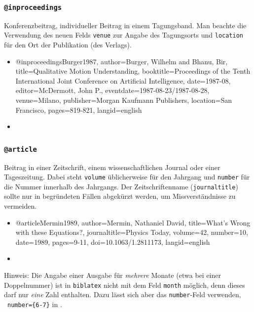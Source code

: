 
\subsubsection{\texttt{\bfseries @inproceedings}}
\label{sec:@inproceedings}

Konferenzbeitrag, individueller Beitrag in einem Tagungsband. Man beachte die
Verwendung des neuen Felds \texttt{venue} zur Angabe des Tagungsorts und
\texttt{location} für den Ort der Publikation (des Verlags).
%
\begin{itemize}
\item[]
\begin{GenericCode}[numbers=none]
@inproceedings{Burger1987,
  author={Burger, Wilhelm and Bhanu, Bir},
  title={Qualitative Motion Understanding},
  booktitle={Proceedings of the Tenth International Joint Conference on Artificial Intelligence},
  date={1987-08},
  editor={McDermott, John P.},
  eventdate={1987-08-23/1987-08-28},
  venue={Milano},
  publisher={Morgan Kaufmann Publishers},
  location={San Francisco},
  pages={819-821},
  langid={english}
}
\end{GenericCode}
\item[\cite{Burger1987}] 
\end{itemize}


\subsubsection{\texttt{\bfseries @article}}
\label{sec:@article}

Beitrag in einer Zeitschrift, einem wissenschaftlichen Journal oder einer
Tageszeitung. Dabei steht \texttt{volume} üblicherweise für den Jahrgang und
\texttt{number} für die Nummer innerhalb des Jahrgangs. Der Zeitschriftenname
(\texttt{journaltitle}) sollte nur in begründeten Fällen abgekürzt werden, um
Missverständnisse zu vermeiden.
%
\begin{itemize}
\item[]
\begin{GenericCode}[numbers=none]
@article{Mermin1989,
  author={Mermin, Nathaniel David},
  title={What's Wrong with these Equations?},
  journaltitle={Physics Today},
  volume={42},
  number={10},
  date={1989},
  pages={9-11},
  doi={10.1063/1.2811173},
  langid={english}
}
\end{GenericCode}
\item[\cite{Mermin1989}] 
\end{itemize}
%
Hinweis: Die Angabe einer Ausgabe für \emph{mehrere} Monate (etwa bei
einer Doppelnummer) ist in \texttt{biblatex} nicht mit dem Feld
\texttt{month} möglich, denn dieses darf nur \emph{eine} Zahl enthalten. Dazu
lässt sich aber das \texttt{number}-Feld verwenden, \zB\
\texttt{number=\{6-7\}} in \cite{Vardavoulia2001}.

